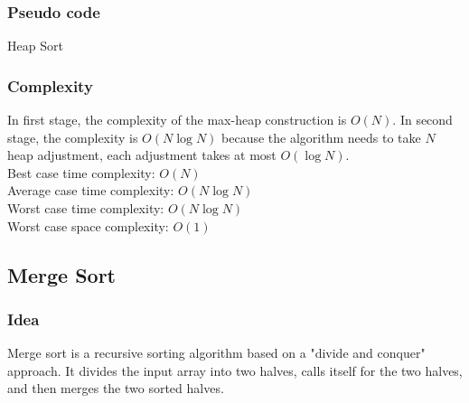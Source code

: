 \documentclass[11pt,a4paper]{article}
\begin{document}
\subsubsection*{Pseudo code}
\begin{algorithm2e}
  \SetAlgoLined


  \caption{Heap Sort}
\end{algorithm2e}

\subsubsection*{Complexity}
In first stage, the complexity of the max-heap construction is $O(N)$.
In second stage, the complexity is $O(N\log N)$ because the algorithm needs to take $N$ heap adjustment, each adjustment takes at most $O(\log N)$.\\ 
Best case time complexity: $O(N)$ \\
Average case time complexity: $O(N\log N)$\\
Worst case time complexity: $O(N \log N)$ \\
Worst case space complexity: $O(1)$

\subsection{Merge Sort}
\subsubsection*{Idea}
Merge sort is a recursive sorting algorithm based on a "divide and conquer" approach.
It divides the input array into two halves, calls itself for the two halves, and then merges the two sorted halves.
\end{document}
